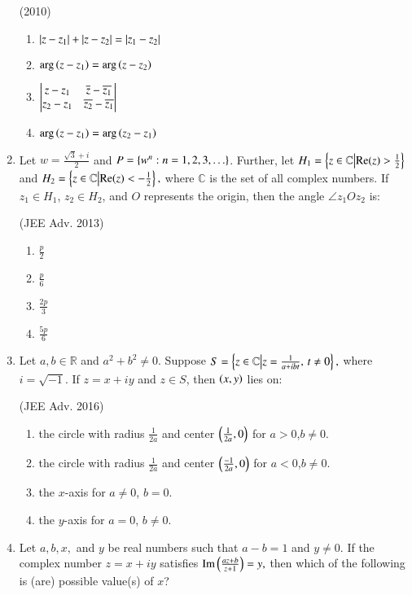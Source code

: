 \documentclass[journal,12pt,twocolumn]{IEEEtran}
\theoremstyle{remark}
\begin{document}
\begin{enumerate}
    \hfill (2010)
\begin{enumerate}
    \item $\left\vert z-z_1\right\vert+\left\vert z-z_2\right\vert=\left\vert z_1-z_2\right\vert$
    \item $\mathrm{arg}\left(z-z_1\right)=\mathrm{arg}\left(z-z_2\right)$
    \item $\begin{vmatrix}z-z_1 & \overline{z}-\overline{z_1} \\z_2-z_1 & \overline{z_2}-\overline{z_1}\end{vmatrix}$
    \item $\mathrm{arg}\left(z-z_1\right)=\mathrm{arg}\left(z_2-z_1\right)$
\end{enumerate}
\item Let $w=\frac{\sqrt{3}+i}{2}$ and $P=\left\{w^n:n=1,2,3,\ldots\right\}$. Further, let $H_1=\left\{z \in \mathbb{C} \middle|\text{Re}(z) > \frac{1}{2}\right\}$ and $H_2=\left\{ z \in \mathbb{C}\middle|\text{Re}(z) < -\frac{1}{2}\right\},$
where $\mathbb{C}$ is the set of all complex numbers. If $z_1 \in H_1$, $z_2 \in H_2$, and $O$ represents the origin, then the angle $\angle z_1Oz_2$ is:

\hfill (JEE Adv. 2013)
\begin{multicols}{4}
    \begin{enumerate}
    \item $\frac{p}{2}$
    \item $\frac{p}{6}$
    \item $\frac{2p}{3}$
    \item $\frac{5p}{6}$
    \end{enumerate}
\end{multicols}
\item Let $a,b \in \mathbb{R}$ and $a^2+b^2 \ne 0$. Suppose $S=\left\{ z \in \mathbb{C}\middle|z = \frac{1}{a + ibt}, \, t \ne 0\right\},$
    where $i=\sqrt{-1}$. If $z=x+iy$ and $z \in S$, then $\left(x,y\right)$ lies on:
    
    \hfill (JEE Adv. 2016)
    \begin{enumerate}
    \item the circle with radius $\frac{1}{2a}$ and center $\left(\frac{1}{2a},0\right)$ for $a>0$,$b \ne 0$.
    \item the circle with radius $\frac{1}{2a}$ and center $\left(\frac{-1}{2a}, 0\right)$ for $a<0$,$b \ne 0$.
    \item the $x$-axis for $a \ne 0$, $b=0$.
    \item the $y$-axis for $a=0$, $b \ne 0$.
    \end{enumerate}
\item Let $a,b,x,$ and $y$ be real numbers such that $a-b=1$ and $y \ne 0$. If the complex number $z=x+iy$ satisfies $\text{Im}\left(\frac{az+b}{z+1}\right)=y,$ then which of the following is (are) possible value(s) of $x$? 


\end{enumerate}
\end{document}
